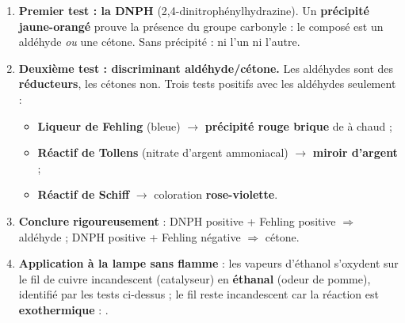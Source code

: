 \documentclass[11pt]{article}
\newcommand{\cle}[1]{{\popxbold\color{popdark}#1}}
\begin{document}
\begin{methode}
\begin{enumerate}
\item \textbf{Premier test : la DNPH} (2,4-dinitrophénylhydrazine). Un \textbf{précipité jaune-orangé} prouve la présence du groupe \cle{carbonyle}  : le composé est un aldéhyde \emph{ou} une cétone. Sans précipité : ni l'un ni l'autre.
\item \textbf{Deuxième test : discriminant aldéhyde/cétone.} Les aldéhydes sont des \textbf{réducteurs}, les cétones non. Trois tests positifs avec les aldéhydes seulement :
\begin{itemize}
\item \textbf{Liqueur de Fehling} (bleue) $\rightarrow$ \textbf{précipité rouge brique} de  à chaud ;
\item \textbf{Réactif de Tollens} (nitrate d'argent ammoniacal) $\rightarrow$ \textbf{miroir d'argent} ;
\item \textbf{Réactif de Schiff} $\rightarrow$ coloration \textbf{rose-violette}.
\end{itemize}
\item \textbf{Conclure rigoureusement} : DNPH positive + Fehling positive $\Rightarrow$ aldéhyde ; DNPH positive + Fehling négative $\Rightarrow$ cétone.
\item \textbf{Application à la lampe sans flamme} : les vapeurs d'éthanol s'oxydent sur le fil de cuivre incandescent (catalyseur) en \textbf{éthanal} (odeur de pomme), identifié par les tests ci-dessus ; le fil reste incandescent car la réaction est \textbf{exothermique} : .
\end{enumerate}
\end{methode}
\end{document}
